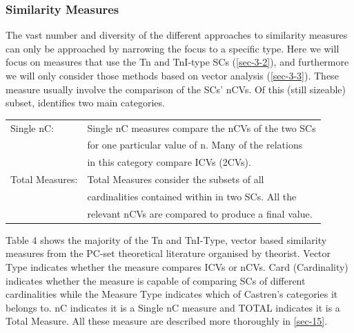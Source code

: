 \documentclass{article}
\begin{document}
\subsubsection{Similarity Measures}
\label{sec-3-4-2}

The vast number and diversity of the different approaches to
similarity measures can only be approached by narrowing the focus to a
specific type. Here we will focus on measures that use the Tn and
TnI-type SCs (\ref{sec-3-2}), and furthermore we will only
consider those methods based on vector analysis (\ref{sec-3-3}). These measure usually involve the comparison of the SCs'
nCVs. Of this (still sizeable) subset, \citet{Castren1994} identifies
two main categories.

\begin{center}
\begin{tabular}{ll}
 Single nC:       &  Single nC measures compare the nCVs of the two SCs    \\
                  &  for one particular value of n. Many of the relations  \\
                  &  in this category compare ICVs (2CVs).                 \\
 Total Measures:  &  Total Measures consider the subsets of all            \\
                  &  cardinalities contained within in two SCs. All the    \\
                  &  relevant nCVs are compared to produce a final value.  \\
\end{tabular}
\end{center}



Table 4 shows the majority of the Tn and TnI-Type, vector based
similarity measures from the PC-set theoretical literature organised
by theorist. Vector Type indicates whether the measure compares ICVs
or nCVs. Card (Cardinality) indicates whether the measure is capable
of comparing SCs of different cardinalities while the Measure Type
indicates which of Castren's categories it belongs to. nC indicates it
is a Single nC measure and TOTAL indicates it is a Total Measure. All
these measure are described more thoroughly in \ref{sec-15}.
\end{document}
